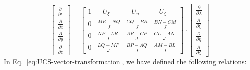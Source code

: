 \begin{equation}
\label{eq:UCS-vector-transformation}
\left[ {\begin{array}{*{20}{c}}
{\frac{\partial }{{\partial t}}}\\
{\frac{\partial }{{\partial x}}}\\
{\frac{\partial }{{\partial y}}}\\
{\frac{\partial }{{\partial z}}}
\end{array}} \right] = \left[ {\begin{array}{*{20}{c}}
1&{ - {U_\xi }}&{ - {U_\eta }}&{ - {U_\zeta }}\\
0&{\frac{{MR - NQ}}{J}}&{\frac{{CQ - BR}}{J}}&{\frac{{BN - CM}}{J}}\\
0&{\frac{{NP - LR}}{J}}&{\frac{{AR - CP}}{J}}&{\frac{{CL - AN}}{J}}\\
0&{\frac{{LQ - MP}}{J}}&{\frac{{BP - AQ}}{J}}&{\frac{{AM - BL}}{J}}
\end{array}} \right] \cdot \left[ {\begin{array}{*{20}{c}}
{\frac{\partial }{{\partial \lambda }}}\\
{\frac{\partial }{{\partial \xi }}}\\
{\frac{\partial }{{\partial \eta }}}\\
{\frac{\partial }{{\partial \zeta }}}
\end{array}} \right]
\end{equation}
In Eq.~\ref{eq:UCS-vector-transformation}, we have defined the following relations:


